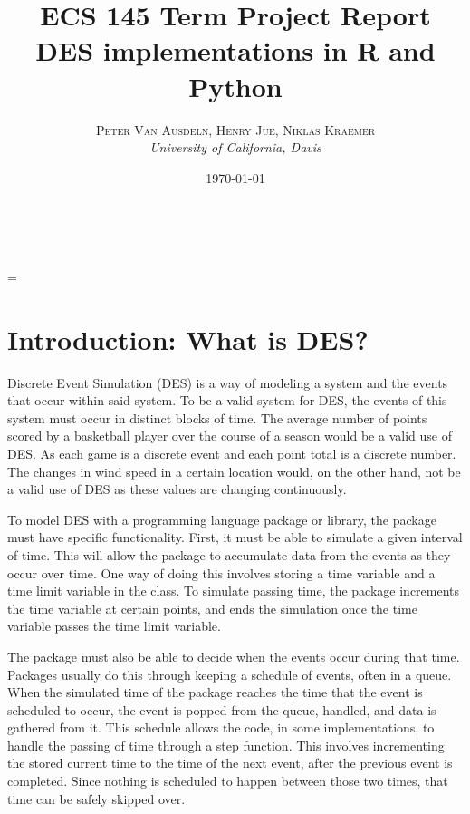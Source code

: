 \documentclass[a4paper, 11pt]{article} %
\title{\textbf{ECS 145 Term Project Report}\\ %
DES implementations in R and Python} %
\author{\textsc{Peter Van Ausdeln, Henry Jue, Niklas Kraemer} %
\\{\textit{University of California, Davis}}} %
\date{\today} %
\makeatletter
\renewcommand{\maketitle}{ %
\begin{flushright} %
{\LARGE\@title} %

\vspace{30pt} %

{\large\@author} %
\\\@date %

\vspace{30pt} %
\end{flushright}
}
\makeatother
\begin{document}
\maketitle %
\pagebreak


\tableofcontents
\pagebreak
\lstlistoflistings
\pagebreak


\parskip = \baselineskip %


\section{Introduction: What is DES?}


Discrete Event Simulation (DES) is a way of modeling a system and the events that occur within said system. To be a valid system for DES, the events of this system must occur in distinct blocks of time. The average number of points scored by a basketball player over the course of a season would be a valid use of DES. As each game is a discrete event and each point total is a discrete number. The changes in wind speed in a certain location would, on the other hand, not be a valid use of DES as these values are changing continuously.

To model DES with a programming language package or library, the package must have specific functionality. First, it must be able to simulate a given interval of time. This will allow the package to accumulate data from the events as they occur over time. One way of doing this involves storing a time variable and a time limit variable in the class. To simulate passing time, the package increments the time variable at certain points, and ends the simulation once the time variable passes the time limit variable.

The package must also be able to decide when the events occur during that time. Packages usually do this through keeping a schedule of events, often in a queue. When the simulated time of the package reaches the time that the event is scheduled to occur, the event is popped from the queue, handled, and data is gathered from it. This schedule allows the code, in some implementations, to handle the passing of time through a step function. This involves incrementing the stored current time to the time of the next event, after the previous event is completed. Since nothing is scheduled to happen between those two times, that time can be safely skipped over.
\end{document}

